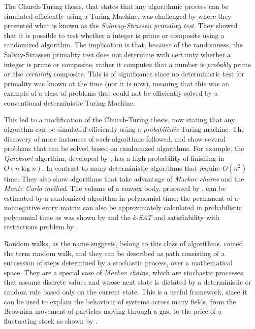 \documentclass[../../dissertation.tex]{subfiles}
\begin{document}
The Church-Turing thesis, that states that any algorithmic process can
be simulated efficiently using a Turing Machine, was challenged by
\cite{solvaystrassen77} where they presented what is known as the
\textit{Solovay-Strassen primality test}. They showed that it is possible to
test whether a integer is prime or composite using a randomized algorithm. The
implication is that, because of the randomness, the Solvay-Strassen primality
test does not determine with certainty whether a integer is prime or composite,
rather it computes that a number is \textit{probably} prime or else
\textit{certainly} composite. This is of significance since no deterministic
test for primality was known at the time (nor it is now), meaning that this was
an example of a class of problems that could not be efficiently solved by a
conventional deterministic Turing Machine.\par

This led to a modification of the Church-Turing thesis, now stating that any
algorithm can be simulated efficiently using a \textit{probabilistic} Turing
machine. The discovery of more instances of such algorithms followed,
\cite{motwani1995} and \cite{papadimitrious1994} show several problems that can
be solved based on randomized algorithms. For example, the \textit{Quicksort}
algorthim, developed by \cite{hoare61}, has a high probability of finishing in
$O(n \log{n})$. In contrast to many deterministic algorithms that require
$O(n^2)$ time. They also show algorithms that take advantage of \textit{Markov
chains} and the \textit{Monte Carlo method}. The volume of a convex body,
proposed by \cite{dyer1991}, can be estimated by a randomized algorithm in
polynomial time; the permanent of a nonnegative entry matrix can also be
approximately calculated in probabilistic polynomial time as was shown by
\cite{jerrum2001} and the \textit{k-SAT} and satisfiability with restrictions
problem by \cite{schoning1999}. \par

Random walks, as the name suggests, belong to this class of algorithms.
\cite{kpearson1905} coined the term random walk, and they can be described as
path consisting of a succession of steps determined by a stochastic process,
over a mathematical space. They are a special case of \textit{Markov chains},
which are stochastic processes that assume discrete values and whose next state
is dictated by a deterministic or random rule based only on the current state.
This is a useful framework, since it can be used to explain the behaviour of
systems across many fields, from the Brownian movement of particles moving
through a gas, to the price of a fluctuating stock as shown by
\cite{cootner67}.\par
\end{document}

